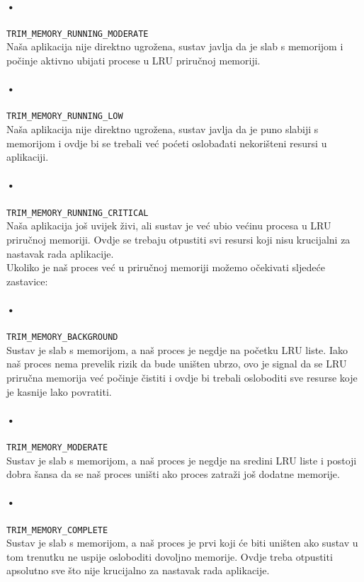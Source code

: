 \documentclass[times, utf8, zavrsni]{fer}
\begin{document}
\paragraph{•}
\verb|TRIM_MEMORY_RUNNING_MODERATE|\\
Naša aplikacija nije direktno ugrožena, sustav javlja da je slab s memorijom i počinje aktivno ubijati procese u LRU priručnoj memoriji.

\paragraph{•}
\verb|TRIM_MEMORY_RUNNING_LOW|\\
Naša aplikacija nije direktno ugrožena, sustav javlja da je puno slabiji s memorijom i ovdje bi se trebali već poćeti oslobađati nekorišteni resursi u aplikaciji.

\paragraph{•}
\verb|TRIM_MEMORY_RUNNING_CRITICAL|\\
Naša aplikacija još uvijek živi, ali sustav je već ubio većinu procesa u LRU priručnoj memoriji. Ovdje se trebaju otpustiti svi resursi koji nisu krucijalni za nastavak rada aplikacije.\\

\noindent
Ukoliko je naš proces već u priručnoj memoriji možemo očekivati sljedeće zastavice:

\paragraph{•}
\verb|TRIM_MEMORY_BACKGROUND|\\
Sustav je slab s memorijom, a naš proces je negdje na početku LRU liste. Iako naš proces nema prevelik rizik da bude uništen ubrzo, ovo je signal da se LRU priručna memorija već počinje čistiti i ovdje bi trebali osloboditi sve resurse koje je kasnije lako povratiti.

\paragraph{•}
\verb|TRIM_MEMORY_MODERATE|\\
Sustav je slab s memorijom, a naš proces je negdje na sredini LRU liste i postoji dobra šansa da se naš proces uništi ako proces zatraži još dodatne memorije.

\paragraph{•}
\verb|TRIM_MEMORY_COMPLETE|\\
Sustav je slab s memorijom, a naš proces je prvi koji će biti uništen ako sustav u tom trenutku ne uspije osloboditi dovoljno memorije. Ovdje treba otpustiti apsolutno sve što nije krucijalno za nastavak rada aplikacije.\\
\end{document}

